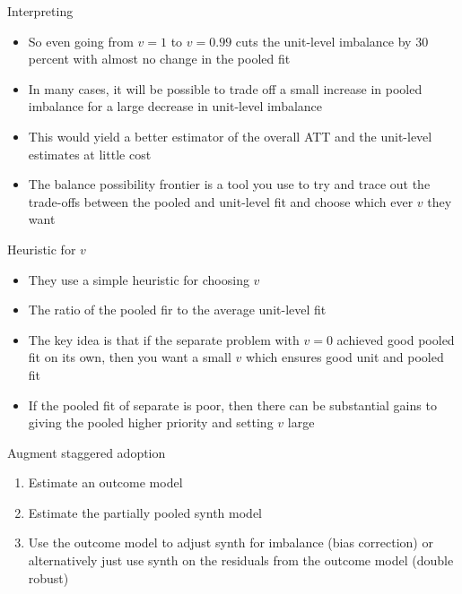 \documentclass{beamer}
\begin{document}
\begin{frame}{Interpreting}

\begin{itemize}

\item So even going from $v=1$ to $v=0.99$ cuts the unit-level imbalance by 30 percent with almost no change in the pooled fit
\item In many cases, it will be possible to trade off a small increase in pooled imbalance for a large decrease in unit-level imbalance
\item This would yield a better estimator of the overall ATT and the unit-level estimates at little cost
\item The balance possibility frontier is a tool you use to try and trace out the trade-offs between the pooled and unit-level fit and choose which ever $v$ they want

\end{itemize}

\end{frame}

\begin{frame}{Heuristic for $v$}

\begin{itemize}

\item They use a simple heuristic for choosing $v$
\item The ratio of the pooled fir to the average unit-level fit
\item The key idea is that if the separate problem with $v=0$ achieved good pooled fit on its own, then you want a small $v$ which ensures good unit and pooled fit
\item If the pooled fit of separate is poor, then there can be substantial gains to giving the pooled higher priority and setting $v$ large

\end{itemize}

\end{frame}




\begin{frame}{Augment staggered adoption}

\begin{enumerate}
\item Estimate an outcome model
\item Estimate the partially pooled synth model
\item Use the outcome model to adjust synth for imbalance (bias correction) or alternatively just use synth on the residuals from the outcome model (double robust)
\end{enumerate}

\end{frame}
\end{document}
